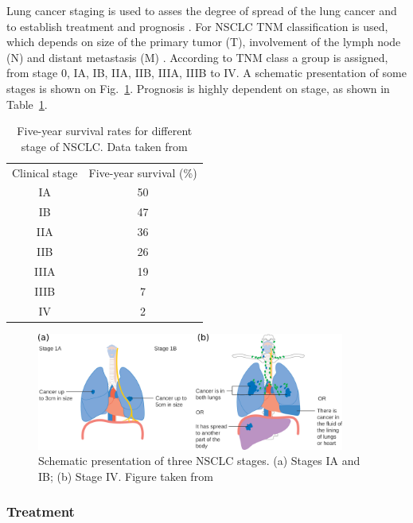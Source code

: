\documentclass[type=dr, dr=rernat, accentcolor=tud7b,colorbacktitle, bigchapter, openright, twoside, 12pt ]{tudthesis}
\begin{document}
Lung cancer staging is used to asses the degree of spread of the lung cancer and to establish treatment and prognosis \cite{Chheang2013}. For NSCLC TNM classification is used, which depends on
size of the primary tumor (T), involvement of the lymph node (N) and distant metastasis (M) \cite{Kasper2015}. According to TNM class a group is assigned, from stage 0, IA, IB, IIA, IIB, IIIA, IIIB to IV. 
A schematic presentation of some stages is shown on Fig.~\ref{Fig:Stages}. Prognosis is highly dependent on stage, as shown in Table~\ref{tab:prognosis}.

\begin{table}[H]
  \centering
  \caption{Five-year survival rates for different stage of NSCLC. Data taken from \cite{Rami2009}}
  \begin{tabular}{|c|c|}
   \hline
   \hline
Clinical stage & Five-year survival (\%) \\
IA & 50 \\
IB & 47 \\
IIA & 36 \\
IIB & 26 \\
IIIA & 19 \\
IIIB & 7 \\
IV & 2 \\
\hline
\hline
  \end{tabular}
  \label{tab:prognosis}
\end{table}

\begin{figure}[H]
\begin{center}
\includegraphics[width=0.9\textwidth]{./Images/Stages.png}
\caption{Schematic presentation of three NSCLC stages. (a) Stages IA and IB; (b) Stage IV. Figure taken from \cite{CancerStage}}
\label{Fig:Stages}
\end{center}
\end{figure}

\subsubsection{Treatment}
\end{document}
